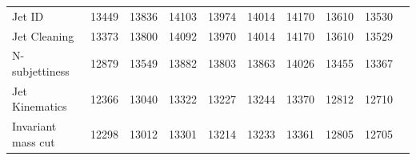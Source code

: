 \begin{landscape}
\begin{table}[p]
\begin{center}
\begin{tabular}{lccccccccc}
 Jet ID            &   13449   &    13836  &    14103  &    13974  &    14014  &    14170  &    13610  &    13530  \\
 Jet Cleaning      &   13373   &    13800  &    14092  &    13970  &    14014  &    14170  &    13610  &    13529  \\
 N-subjettiness    &   12879   &    13549  &    13882  &    13803  &    13863  &    14026  &    13455  &    13367  \\
 Jet Kinematics    &   12366   &    13040  &    13322  &    13227  &    13244  &    13370  &    12812  &    12710  \\
 Invariant mass cut&   12298   &    13012  &    13301  &    13214  &    13233  &    13361  &    12805  &    12705  \\
\hline
\end{tabular}
\end{center}
\end{table}
\end{landscape}

